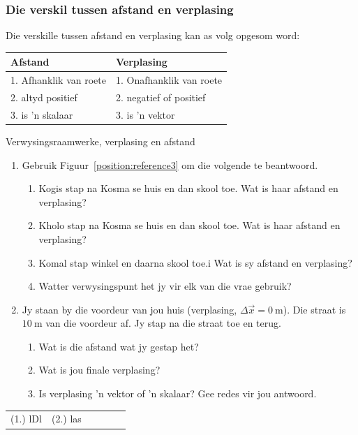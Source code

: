 \subsubsection*{Die verskil tussen afstand en verplasing}
            \nopagebreak
Die verskille tussen afstand en verplasing kan as volg opgesom word:\par
\begin{center}
\begin{tabular}{|l|l|}\hline
\textbf{ Afstand} & \textbf{ Verplasing} \\\hline
1. Afhanklik van roete & 1. Onafhanklik van roete \\\hline
2. altyd positief & 2. negatief of positief \\\hline
3. is  'n skalaar & 3. is  'n vektor\\\hline
\end{tabular}
\end{center}
    \par
\label{m38788*secfhsst!!!underscore!!!id498}
\begin{exercises}{Verwysingsraamwerke, verplasing en afstand}
\nopagebreak \noindent
\begin{enumerate}[noitemsep, label=\textbf{\arabic*}. ] 
\item Gebruik Figuur~\ref{position:reference3} om die volgende te beantwoord.
\begin{enumerate}[noitemsep, label=\textbf{\alph*}. ] 
    \item Kogis stap na Kosma se huis en dan skool toe. Wat is haar afstand en verplasing?
    \item Kholo stap na Kosma se huis en dan skool toe. Wat is haar afstand en verplasing?
    \item Komal stap winkel en daarna skool toe.i Wat is sy afstand en verplasing?
    \item Watter verwysingspunt het jy vir elk van die vrae gebruik?
\end{enumerate}
                
\item Jy staan by die voordeur van jou huis (verplasing, $\Delta \vec{x}=0~\text{m}$). Die straat is $10~\text{m}$ van die voordeur af. Jy stap na die straat toe en terug.
\begin{enumerate}[noitemsep, label=\textbf{\alph*}. ] 
    \item Wat is die afstand wat jy gestap het?
    \item Wat is jou finale verplasing?
    \item Is verplasing  'n vektor of  'n skalaar? Gee redes vir jou antwoord.
\end{enumerate}
\end{enumerate}
  \label{m38788**end}
\practiceinfo
 \par \begin{tabular}[h]{cccccc}
 (1.) lDl  &  (2.) las  & \end{tabular}
\end{exercises}



